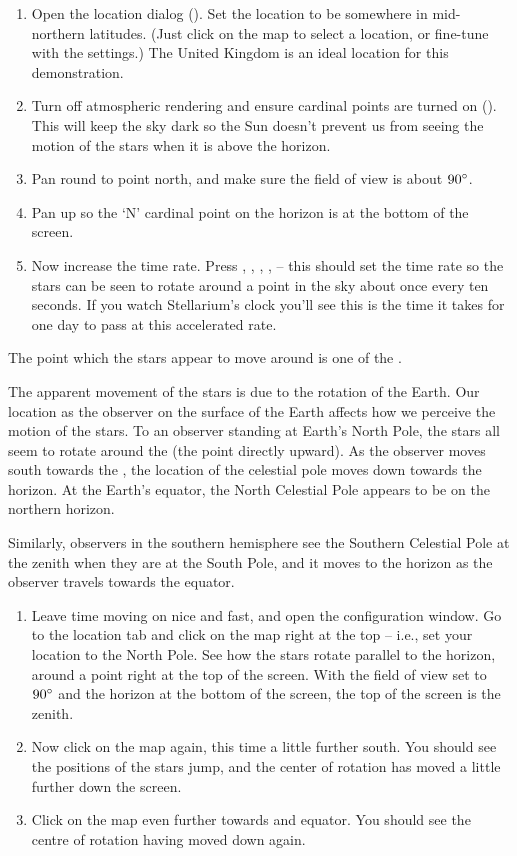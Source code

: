 \begin{enumerate}
\item Open the location dialog (). Set the location to be
  somewhere in mid-northern latitudes. (Just click on the map to
  select a location, or fine-tune with the settings.) The United
  Kingdom is an ideal location for this demonstration.
\item Turn off atmospheric rendering  and ensure cardinal points are
  turned on (). This will keep the sky dark so the Sun doesn't prevent us
  from seeing the motion of the stars when it is above the horizon.
\item Pan round to point north, and make sure the field of view is
  about $90\degree$.
\item Pan up so the `N' cardinal point on the horizon is at the bottom
  of the screen.
\item Now increase the time rate. Press , , ,
  ,  -- this should set the time rate so the stars can
  be seen to rotate around a point in the sky about once every ten
  seconds. If you watch Stellarium's clock you'll see this is the time
  it takes for one day to pass at this accelerated rate.
\end{enumerate}

The point which the stars appear to move around is one of the
.

The apparent movement of the stars is due to the rotation of the Earth.
Our location as the observer on the surface of the Earth affects how we
perceive the motion of the stars. To an observer standing at Earth's
North Pole, the stars all seem to rotate around the  (the
point directly upward). As the observer moves south towards the ,
the location of the celestial pole moves down towards the horizon. At
the Earth's equator, the North Celestial Pole appears to be on the
northern horizon.

Similarly, observers in the southern hemisphere see the Southern
Celestial Pole at the zenith when they are at the South Pole, and it
moves to the horizon as the observer travels towards the equator.

\begin{enumerate}
\item
  Leave time moving on nice and fast, and open the configuration window.
  Go to the location tab and click on the map right at the top -- i.e.,
  set your location to the North Pole. See how the stars rotate parallel to the horizon, around a
  point right at the top of the screen. With the field of view set to
  $90\degree$ and the horizon at the bottom of the screen, the top of the screen
  is the zenith.
\item
  Now click on the map again, this time a little further south. You
  should see the positions of the stars jump, and the center of rotation
  has moved a little further down the screen.
\item
  Click on the map even further towards and equator. You should see the
  centre of rotation having moved down again.
\end{enumerate}

